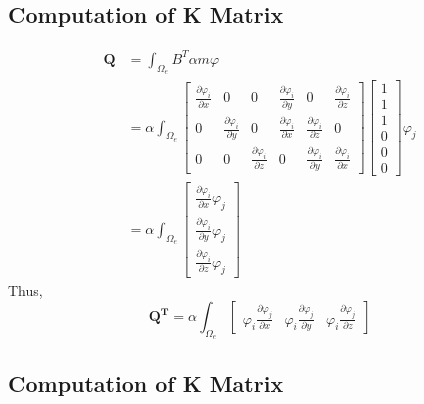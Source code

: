 \documentclass[12pt]{article}
\begin{document}
\subsection{Computation of K Matrix}

\begin{equation}
\begin{split}
\mathbf{Q}&=\int_{\Omega_e}B^T\alpha m \varphi	\\
%
&=\alpha\int_{\Omega_e}\left[
\begin{array}{cccccc}
\frac{\partial \varphi_i}{\partial x} & 0 & 0  &\frac{\partial \varphi_i}{\partial y}&0&\frac{\partial \varphi_i}{\partial z}			\\
0 &\frac{\partial \varphi_i}{\partial y} & 0  	&\frac{\partial \varphi_i}{\partial x}&\frac{\partial \varphi_i}{\partial z}&0			\\
0 & 0 &\frac{\partial \varphi_i}{\partial z} 	&0&\frac{\partial \varphi_i}{\partial y}&\frac{\partial \varphi_i}{\partial x}			
\end{array}
\right]
%
\left[
\begin{array}{c}
1	\\
1	\\
1	\\
0	\\
0	\\
0
\end{array}	
\right]\varphi_j	\\
%
&=\alpha\int_{\Omega_e}
\left[
\begin{array}{c}
\frac{\partial \varphi_i}{\partial x}\varphi_j	\\
\frac{\partial \varphi_i}{\partial y}\varphi_j	\\
\frac{\partial \varphi_i}{\partial z}\varphi_j
\end{array}	
\right]
\end{split}
\end{equation}
\newline
Thus,
\newline
\begin{equation}
\mathbf{Q^T}=\alpha\int_{\Omega_e}
\left[
\begin{array}{ccc}
\varphi_i\frac{\partial \varphi_j}{\partial x}	&\varphi_i\frac{\partial \varphi_j}{\partial y}&
\varphi_i\frac{\partial \varphi_j}{\partial z}
\end{array}	
\right]
\end{equation}
\subsection{Computation of K Matrix}
\end{document}
